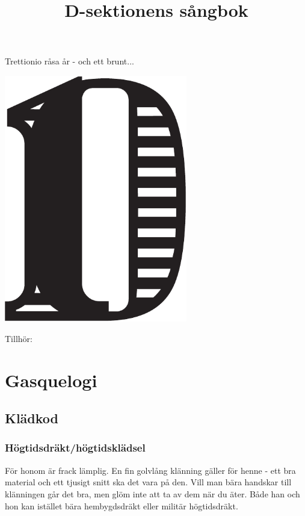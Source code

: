 \documentclass{article}
\title{\fontsize{20}{20} \selectfont D-sektionens sångbok \vspace{-40pt}}
\author{}
\date{}
\renewcommand{\headrulewidth}{0 pt}
\begin{document}
\thispagestyle{empty}
\maketitle
\thispagestyle{empty} %

\begin{center}
Trettionio råsa år - och ett brunt... 
\end{center}
\vspace{1mm} %



\begin{center}
   \includegraphics[width=0.6\textwidth]{res/D-symbol.pdf}
\end{center}



\newpage
Tillhör:
\newpage
\thispagestyle{plain}
\tableofcontents
\newpage
\thispagestyle{empty}
\section{Gasquelogi}
\subsection{Klädkod}
\subsubsection{Högtidsdräkt/högtidsklädsel}
För honom är frack lämplig. En fin golvlång klänning
gäller för henne - ett bra material och ett tjusigt snitt ska
det vara på den. Vill man bära handskar till klänningen
går det bra, men glöm inte att ta av dem när du äter.
Både han och hon kan istället bära hembygdsdräkt eller
militär högtidsdräkt.
\end{document}
